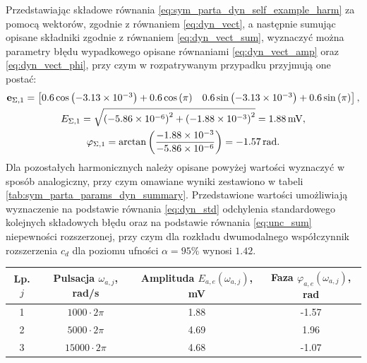 Przedstawiając składowe równania \eqref{eq:sym_parta_dyn_self_example_harm} za pomocą wektorów, zgodnie z równaniem \eqref{eq:dyn_vect}, a następnie sumując opisane składniki zgodnie z równaniem \eqref{eq:dyn_vect_sum}, wyznaczyć można parametry błędu wypadkowego opisane równaniami \eqref{eq:dyn_vect_amp} oraz \eqref{eq:dyn_vect_phi}, przy czym w rozpatrywanym przypadku przyjmują one postać:
\begin{gather}
\mathbf{e}_{\Sigma,1} =
\begin{bmatrix}
0.6 \cos \left(\num{-3.13e-3}\right) + 0.6 \cos \left(\pi\right) & 0.6 \sin \left(\num{-3.13e-3}\right) + 0.6 \sin \left(\pi\right)
\end{bmatrix}
\label{eq:sym_parta_dyn_self_example_sum}, \\
E_{\Sigma,1} = \sqrt{\left(\num{-5.86e-6}\right)^{2} + \left(\num{-1.88e-3}\right)^{2}} = \qty{1.88}{mV} \label{eq:sym_parta_dyn_self_example_amp}, \\
\varphi_{\Sigma,1} = \arctan \left(\frac{\num{-1.88e-3}}{\num{-5.86e-6}}\right) = \qty{-1.57}{rad} \label{eq:sym_parta_dyn_self_example_phi}.
\end{gather}
Dla pozostałych harmonicznych należy opisane powyżej wartości wyznaczyć w sposób analogiczny, przy czym omawiane wyniki zestawiono w tabeli \ref{tab:sym_parta_params_dyn_summary}. Przedstawione wartości umożliwiają wyznaczenie na podstawie równania \eqref{eq:dyn_std} odchylenia standardowego kolejnych składowych błędu oraz na podstawie równania \eqref{eq:unc_sum} niepewności rozszerzonej, przy czym dla rozkładu dwumodalnego współczynnik rozszerzenia $c_{d}$ dla poziomu ufności $\alpha = 95\%$ wynosi $1.42$.

\begin{table}[htb!]
\begin{center}
\begin{tabular}[c]{| c | c | S[table-format = 1.2] | S[table-format = +1.2] |} \hline
\textbf{Lp. $j$} & \textbf{Pulsacja $\omega_{a,j}$, rad/s} & \textbf{Amplituda $E_{a,e}(\omega_{a,j})$, mV} & \textbf{Faza $\varphi_{a,e}(\omega_{a,j})$, rad} \\  & $1000  \cdot 2\pi$  &  1.88  & -1.57  \\  & $5000  \cdot 2\pi$  &  4.69  &  1.96  \\  & $15000 \cdot 2\pi$  &  4.68  & -1.07  \\ \hline
\end{tabular}
\end{center}
\end{table}

